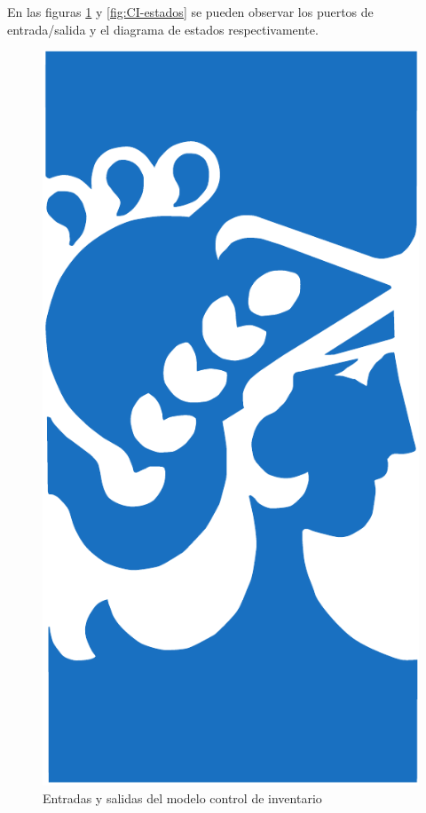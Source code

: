 \documentclass[10pt]{article}
\begin{document}
En las figuras \ref{fig:CI-esquematico} y \ref{fig:CI-estados} se pueden observar los puertos de entrada/salida y el diagrama de estados respectivamente.

\begin{figure}[htbp]
	\centering
	\includegraphics{img/fiuba}
	\caption{Entradas y salidas del modelo control de inventario}
	\label{fig:CI-esquematico}
\end{figure}
\end{document}
